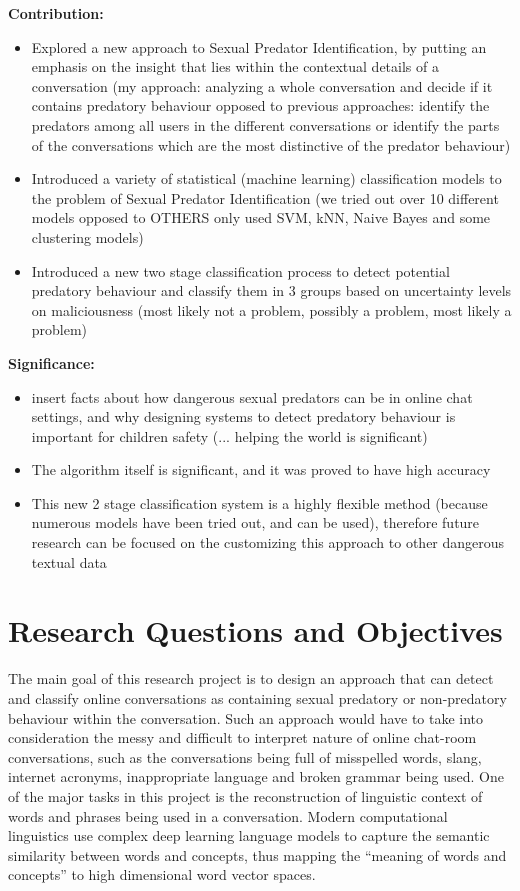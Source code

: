 \documentclass[11pt]{article}
\begin{document}
\textbf{Contribution:}
\begin{itemize}
    \item Explored a new approach to Sexual Predator Identification, by putting an emphasis on the insight that lies within the contextual details of a conversation (my approach: analyzing a whole conversation and decide if it contains predatory behaviour opposed to previous approaches: identify the predators among all users in the different conversations or identify the parts of the conversations which are the most distinctive of the predator behaviour)
    \item Introduced a variety of statistical (machine learning) classification models to the problem of Sexual Predator Identification (we tried out over 10 different models opposed to OTHERS only used SVM, kNN, Naive Bayes and some clustering models)
    \item Introduced a new two stage classification process to detect potential predatory behaviour and classify them in 3 groups based on uncertainty levels on maliciousness (most likely not a problem, possibly a problem, most likely a problem)
\end{itemize}

\textbf{Significance:}
\begin{itemize}
    \item insert facts about how dangerous sexual predators can be in online chat settings, and why designing systems to detect predatory behaviour is important for children safety (... helping the world is significant)
    \item The algorithm itself is significant, and it was proved to have high accuracy
    \item This new 2 stage classification system is a highly flexible method (because numerous models have been tried out, and can be used), therefore future research can be focused on the customizing this approach to other dangerous textual data
\end{itemize}

\section{Research Questions and Objectives}
\indent The main goal of this research project is to design an approach that can detect and classify online conversations as containing sexual predatory or non-predatory behaviour within the conversation. Such an approach would have to take into consideration the messy and difficult to interpret nature of online chat-room conversations, such as the conversations being full of misspelled words, slang, internet acronyms, inappropriate language and broken grammar being used. One of the major tasks in this project is the reconstruction of linguistic context of words and phrases being used in a conversation. Modern computational linguistics use complex deep learning language models to capture the semantic similarity between words and concepts, thus mapping the ``meaning of words and concepts” to high dimensional word vector spaces. 
\end{document}
